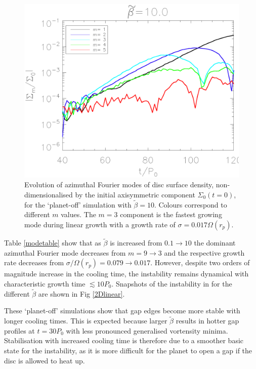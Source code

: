 \begin{figure}
  \includegraphics[width=\linewidth,clip=true,trim=1.2cm
  0cm 0cm 0cm]{figures/linear_stability}
  \caption{Evolution of azimuthal Fourier modes of disc surface
    density, non-dimensionalised by the initial axisymmetric component 
    $\Sigma_0(t=0)$, for the
    `planet-off' simulation with $\tilde{\beta}=10$. Colours correspond
    to different $m$ values. The $m=3$ component is the fastest growing
    mode during linear growth with a growth rate of 
    $\sigma=0.017\Omega(r_p)$.\label{linearmodes}}
\end{figure}


Table \ref{modetable} show that as
$\tilde{\beta}$ is increased from $ 0.1\rightarrow10$ the dominant
azimuthal Fourier mode decreases from $ m=9\rightarrow3$ and the
respective growth rate decreases from $ \sigma/\Omega(r_p)=0.079
\rightarrow 0.017$. However, despite two orders of magnitude increase in the
cooling time, the instability remains dynamical with characteristic  growth time
$\lesssim 10P_0$. Snapshots of the instability in for  
the different $\tilde\beta$ are shown in Fig \ref{2Dlinear}. 

These `planet-off' simulations show that gap edges become more stable with
longer cooling times. This is expected because larger $\tilde{\beta}$
results in hotter gap profiles at $t=30P_0$ with less pronounced
generalised vortensity minima. Stabilisation with increased
cooling time is therefore due to a smoother basic state for the
instability, as it is more difficult for the planet to open a gap if
the disc is allowed to heat up. 

